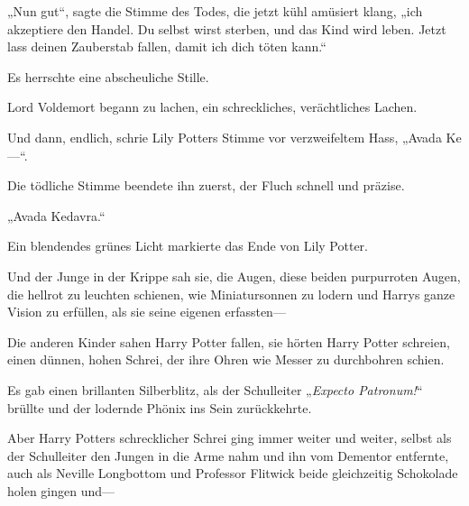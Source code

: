 \begin{em}
„Nun gut“, sagte die Stimme des Todes, die jetzt kühl amüsiert klang, „ich akzeptiere den Handel. Du selbst wirst sterben, und das Kind wird leben. Jetzt lass deinen Zauberstab fallen, damit ich dich töten kann.“

Es herrschte eine abscheuliche Stille.

Lord Voldemort begann zu lachen, ein schreckliches, verächtliches Lachen.

Und dann, endlich, schrie Lily Potters Stimme vor verzweifeltem Hass, „Avada Ke—“.

Die tödliche Stimme beendete ihn zuerst, der Fluch schnell und präzise.

„Avada Kedavra.“

Ein blendendes grünes Licht markierte das Ende von Lily Potter.

Und der Junge in der Krippe sah sie, die Augen, diese beiden purpurroten Augen, die hellrot zu leuchten schienen, wie Miniatursonnen zu lodern und Harrys ganze Vision zu erfüllen, als sie seine eigenen erfassten—
\end{em}

\later

Die anderen Kinder sahen Harry Potter fallen, sie hörten Harry Potter schreien, einen dünnen, hohen Schrei, der ihre Ohren wie Messer zu durchbohren schien.

Es gab einen brillanten Silberblitz, als der Schulleiter „\emph{Expecto Patronum!}“ brüllte und der lodernde Phönix ins Sein zurückkehrte.

Aber Harry Potters schrecklicher Schrei ging immer weiter und weiter, selbst als der Schulleiter den Jungen in die Arme nahm und ihn vom Dementor entfernte, auch als Neville Longbottom und Professor Flitwick beide gleichzeitig Schokolade holen gingen und—

